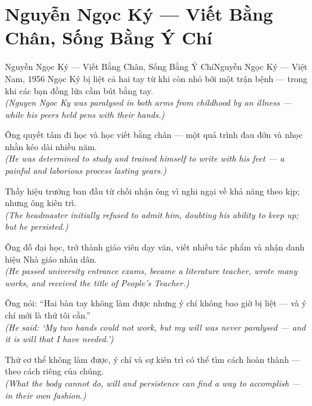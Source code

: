 \section{Nguyễn Ngọc Ký --- Viết Bằng Chân, Sống Bằng Ý Chí}
\begin{truyen}{Nguyễn Ngọc Ký --- Viết Bằng Chân, Sống Bằng Ý Chí}{Nguyễn Ngọc Ký --- Việt Nam, 1956}
 Ngọc Ký bị liệt cả hai tay từ khi còn nhỏ bởi một trận bệnh --- trong khi các bạn đồng lứa cầm bút bằng tay.\\[4pt]
\textit{(Nguyen Ngoc Ky was paralysed in both arms from childhood by an illness --- while his peers held pens with their hands.)}

Ông quyết tâm đi học và học viết bằng chân --- một quá trình đau đớn và nhọc nhằn kéo dài nhiều năm.\\[4pt]
\textit{(He was determined to study and trained himself to write with his feet --- a painful and laborious process lasting years.)}

Thầy hiệu trưởng ban đầu từ chối nhận ông vì nghi ngại về khả năng theo kịp; nhưng ông kiên trì.\\[4pt]
\textit{(The headmaster initially refused to admit him, doubting his ability to keep up; but he persisted.)}

Ông đỗ đại học, trở thành giáo viên dạy văn, viết nhiều tác phẩm và nhận danh hiệu Nhà giáo nhân dân.\\[4pt]
\textit{(He passed university entrance exams, became a literature teacher, wrote many works, and received the title of People's Teacher.)}

Ông nói: ``Hai bàn tay không làm được nhưng ý chí không bao giờ bị liệt --- và ý chí mới là thứ tôi cần.''\\[4pt]
\textit{(He said: `My two hands could not work, but my will was never paralysed --- and it is will that I have needed.')}

\end{truyen}
\begin{baihoc}
  Thứ cơ thể không làm được, ý chí và sự kiên trì có thể tìm cách hoàn thành --- theo cách riêng của chúng.\\[4pt]
  \textit{(What the body cannot do, will and persistence can find a way to accomplish --- in their own fashion.)}
\end{baihoc}

